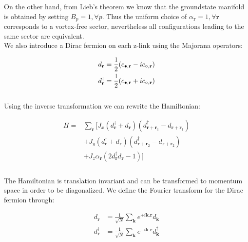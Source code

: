 \documentclass{article}
\begin{document}
\noindent On the other hand, from Lieb's theorem \cite{Lieb_1994} we know that the groundstate manifold is obtained by setting $B_p = 1, \forall p$. 
Thus the uniform choice of $\alpha_\textbf{r}=1, \forall \textbf{r}$ corresponds to a vortex-free sector, nevertheless all configurations leading to the same sector are equivalent.\\

\noindent We also introduce a Dirac fermion on each z-link using the Majorana operators:

\begin{equation}\label{eq:11}
	\begin{aligned}
		d_\textbf{r} &= \frac{1}{2} (c_{\color{black}\bullet,\textbf{r}} - ic_{\circ,\textbf{r}})\\
		d^\dagger_\textbf{r} &= \frac{1}{2} (c_{\color{black}\bullet,\textbf{r}} + ic_{\circ,\textbf{r}})
	\end{aligned}
\end{equation}\\

\noindent Using the inverse transformation we can rewrite the Hamiltonian:

\begin{equation}\label{eq:12}
	\begin{aligned}
		H= &\sum_{\textbf{r}}[J_x (d^\dagger_{\textbf{r}} + d_{\textbf{r}})(d^\dagger_{\textbf{r}+\textbf{r}_1} - d_{\textbf{r}+\textbf{r}_1}) \\
		&+J_y (d^\dagger_{\textbf{r}} + d_{\textbf{r}})(d^\dagger_{\textbf{r}+\textbf{r}_2} - d_{\textbf{r}+\textbf{r}_2}) \\
		&+J_z \alpha_\textbf{r}(2d^\dagger_{\textbf{r}}d_{\textbf{r}}-1)]\\ 
	\end{aligned}
\end{equation}\\

\noindent The Hamiltonian is translation invariant and can be transformed to momentum space in order to be diagonalized. We define the Fourier transform for the Dirac fermion through:

\begin{equation}\label{eq:13}
	\begin{aligned}
		d_{\textbf{r}} &= \frac{1}{\sqrt{N}}\sum_\textbf{k} e^{+i\textbf{k}.\textbf{r}}d_{\textbf{k}} \\
		d^\dagger_{\textbf{r}} &= \frac{1}{\sqrt{N}}\sum_\textbf{k} e^{-i\textbf{k}.\textbf{r}}d^\dagger_{\textbf{k}} \\
	\end{aligned}
\end{equation}\\
\end{document}
